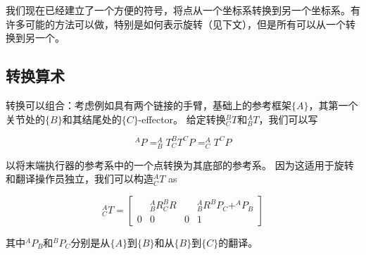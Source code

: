 
我们现在已经建立了一个方便的符号，将点从一个坐标系转换到另一个坐标系。有许多可能的方法可以做，特别是如何表示旋转（见下文），但是所有可以从一个转换到另一个。

\subsection{转换算术}

转换可以组合：考虑例如具有两个链接的手臂，基础上的参考框架$ \{A \} $，其第一个关节处的$ \{B \} $和其结尾处的$ \{C \} $-effector。 给定转换$ ^ B_CT $和$ ^ A_BT $，我们可以写

\begin{equation}
^AP=^A_BT^B_CT^CP=^A_CT^CP
\end{equation}

以将末端执行器的参考系中的一个点转换为其底部的参考系。 因为这适用于旋转和翻译操作员独立，我们可以构造$ ^ A_CT $ as

\begin{equation}
^A_CT=\left[\begin{array}{ccc|c} & ^A_BR^B_CR & & ^A_BR^BP_C +^AP_B \\\hline 0 & 0 & 0 & 1\end{array}\right]
\end{equation}
%

其中$ ^ AP_B $和$ ^ BP_C $分别是从$ \{A \} $到$ \{B \} $和从$ \{B \} $到$ \{C \} $的翻译。

